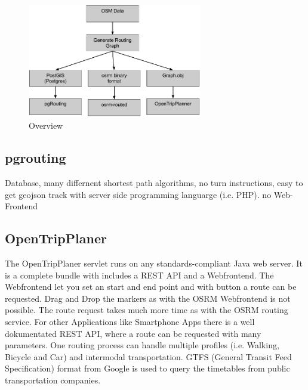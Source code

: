 \documentclass{sig-alternate}
\begin{document}
\begin{figure}
\centering
\includegraphics[width=3in]{Overview2.png}
\caption{Overview}
\end{figure}

\subsection{pgrouting\cite{pgrouting}}
Database, many differnent shortest path algorithms, no turn instructions, easy to get geojson track with server side programming languarge (i.e. PHP). no Web-Frontend




\subsection{OpenTripPlaner}
 
The OpenTripPlaner servlet runs on any standards-compliant Java web server. It is a complete bundle with includes a REST API and a Webfrontend. The Webfrontend let you set an start and end point and with button a route can be requested. Drag and Drop the markers as with the OSRM Webfrontend is not possible. The route request takes much more time as with the OSRM routing service. For other Applications like Smartphone Apps there is a well dokumentated REST API, where a route can be requested with many parameters. One routing process can handle multiple profiles (i.e. Walking, Bicycle and Car) and intermodal transportation. GTFS (General Transit Feed Specification) format from Google is used to query the timetables from public transportation companies. 
\end{document}
